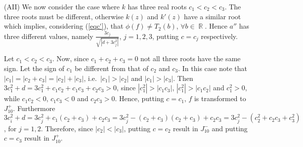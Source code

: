 \documentclass[noend]{amsproc}
\theoremstyle{definition}
\DeclareMathOperator{\R}{\mathbb{R}}
\begin{document}
(AII) We now consider the case where $k$ has three real roots $c_1<c_2<c_3$. The three roots must be different, otherwise $k(z)$ and $k'(z)$ have a similar root which implies, considering (\ref{eqc'}), that $\phi(f)\neq T_2(b)$, $\forall b\in\R$. Hence $a''$ has three different values, namely $\frac{3c_j}{\sqrt{|d+3c_j^2|}}$, $j=1,2,3$, putting $c=c_j$ respectively.

Let $c_1<c_2<c_3$. Now, since $c_1+c_2+c_3=0$ not all three roots have the same sign. Let the sign of $c_1$ be different from that of $c_2$ and $c_3$. In this case note that $|c_1|=|c_2+c_3|=|c_2|+|c_3|$, i.e.~$|c_1|>|c_2|$ and $|c_1|>|c_3|$. Then $3c_1^2+d=3c_1^2+c_1c_2+c_1c_3+c_2c_3>0$, since $|c_1^2|>|c_1c_3|$, $|c_1^2|>|c_1c_2|$ and $c_1^2>0$, while $c_1c_2<0$, $c_1c_3<0$ and $c_2c_3>0$. Hence, putting $c=c_1$, $f$ is transformed to $J_{10}^+$.
Furthermore $3c_i^2+d=3c_j^2+c_1(c_2+c_3)+c_2c_3=3c_j^2-(c_2+c_3)(c_2+c_3)+c_2c_3=3c_j^2-(c_2^2+c_2c_3+c_3^2)$, for $j=1,2$. Therefore, since $|c_2|<|c_3|$, putting $c=c_2$ result in $J_{10}^-$ and putting $c=c_3$ result in $J_{10}^+$.
\end{document}
